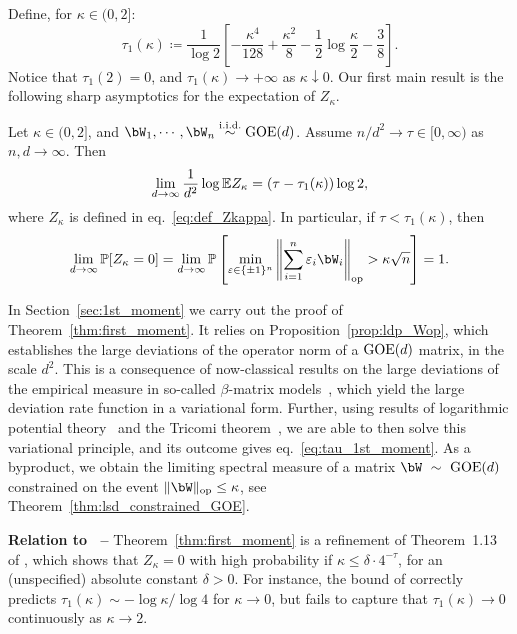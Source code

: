 Define, for $\kappa \in (0,2]$:
\begin{equation}
    \label{eq:tau_1st_moment}
    \tau_1(\kappa) \coloneqq
        \frac{1}{\log 2} \left[- \frac{\kappa^4}{128} + \frac{\kappa^2}{8} - \frac{1}{2} \log \frac{\kappa}{2} - \frac{3}{8}\right].
\end{equation}
Notice that $\tau_1(2) = 0$, and $\tau_1(\kappa) \to +\infty$ as $\kappa \downarrow 0$.
Our first main result is the following sharp asymptotics for the expectation of $Z_\kappa$.
\begin{theorem}\label{thm:first_moment}
    Let $\kappa \in (0,2]$, and $\bW_1, \cdots, \bW_n \iid \GOE(d)$.
    Assume $n/d^2 \to \tau \in [0, \infty)$ as $n, d\to \infty$. 
    Then 
    \begin{equation}
        \label{eq:limit_logEZ}
        \lim_{d \to \infty} \frac{1}{d^2} \log \mathbb{E} Z_\kappa = (\tau - \tau_1(\kappa)) \log 2,
    \end{equation}
    where $Z_\kappa$ is defined in eq.~\eqref{eq:def_Zkappa}.
    In particular, if $\tau < \tau_1(\kappa)$, then
    \begin{equation*}
        \lim_{d \to \infty} \bbP[Z_\kappa = 0] = \lim_{d \to \infty} \bbP\left[\min_{\eps \in \{\pm 1\}^n} \left\|\sum_{i=1}^n \eps_i \bW_i \right\|_\op > \kappa \sqrt{n}\right] = 1.
    \end{equation*}
\end{theorem}
\noindent
In Section~\ref{sec:1st_moment} we carry out the proof of Theorem~\ref{thm:first_moment}. 
It relies on Proposition~\ref{prop:ldp_Wop}, which establishes the large deviations of the operator norm of a 
$\mathrm{GOE}(d)$ matrix, in the scale $d^2$. This is a consequence of now-classical results on the large deviations of the empirical measure 
in so-called $\beta$-matrix models~\citep{arous1997large,anderson2010introduction}, which yield the large deviation rate function in a variational form. 
Further, using results of logarithmic potential theory~\citep{saff2013logarithmic} and the Tricomi theorem~\citep{tricomi1985integral}, we are able to then solve this variational principle,
and its outcome gives eq.~\eqref{eq:tau_1st_moment}.
As a byproduct, we obtain the limiting spectral measure of a matrix $\bW~\sim~\GOE(d)$ constrained on the event $\|\bW\|_\op \leq \kappa$, see Theorem~\ref{thm:lsd_constrained_GOE}.

\myskip
\textbf{Relation to~\cite{kunisky2023online} --}
Theorem~\ref{thm:first_moment} is a refinement of Theorem~1.13 of \cite{kunisky2023online}, 
which shows that $Z_\kappa = 0$ with high probability if $\kappa \leq \delta \cdot 4^{-\tau}$, for an (unspecified) absolute constant $\delta > 0$.
For instance, the bound of \cite{kunisky2023online} correctly predicts $\tau_1(\kappa) \sim - \log \kappa / \log 4$ for $\kappa \to 0$, but fails to capture that $\tau_1(\kappa) \to 0$ continuously as $\kappa \to 2$. 

